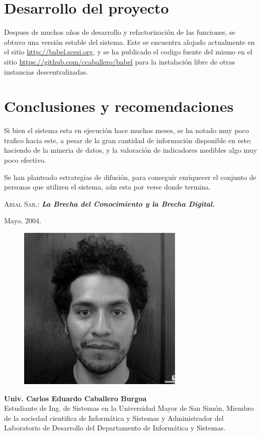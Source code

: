 \documentclass[letter,11pt,oneside,spanish]{article}
\begin{document}
\section{Desarrollo del proyecto}
Despues de muchos años de desarrollo y refactorización de las funciones, se
obtuvo una versión estable del sistema. Este se encuentra alojado actualmente
en el sitio \url{http://babel.scesi.org}, y se ha publicado el codigo fuente del
mismo en el sitio \url{https://github.com/ccaballero/babel} para la instalación
libre de otras instancias descentralizadas.

\section{Conclusiones y recomendaciones}
Si bien el sistema esta en ejecución hace muchos meses, se ha notado muy poco
trafico hacia este, a pesar de la gran cantidad de información disponible en
este; haciendo de la mineria de datos, y la valoración de indicadores medibles
algo muy poco efectivo.

Se han planteado estrategias de difusión, para conseguir enriquecer el conjunto
de personas que utilizen el sistema, aún esta por verse donde termina.

\newpage
\begin{thebibliography}{99}
        \textsc{Arial Sar.:}
        \textit{\textbf{La Brecha del Conocimiento y la Brecha Digital.}}
        \par Mayo, 2004.
\end{thebibliography}

\newpage
\begin{figure}
 \includegraphics[scale=0.3]{jacobian.jpg}
\end{figure}
\textbf{Univ. Carlos Eduardo Caballero Burgoa}\\
Estudiante de Ing. de Sistemas en la Universidad Mayor de San Simón, Miembro de la sociedad cientifica
de Informática y Sistemas y Administrador del Laboratorio de Desarrollo del Departamento de
Informática y Sistemas.
\end{document}
